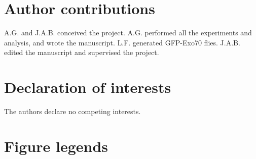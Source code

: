 \documentclass[12pt, twoside, letterpaper]{article}
\begin{document}
\begin{doublespacing}
\begin{linenumbers}
    \section*{Author contributions}
    A.G. and J.A.B. conceived the project.
    A.G. performed all the experiments and analysis, and wrote the manuscript.
    L.F. generated GFP-Exo70 flies.
    J.A.B. edited the manuscript and supervised the project.
    
    \section*{Declaration of interests}
    The authors declare no competing interests.

    \section*{Figure legends}
    

\end{linenumbers}
\end{doublespacing}
\end{document}
